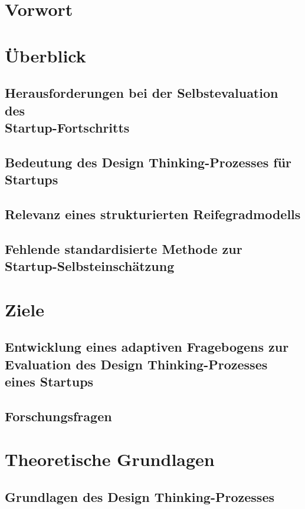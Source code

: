 \thispagestyle{fancy}
\chapter{Vorwort}
\chapter{Überblick}

\section{Herausforderungen bei der Selbstevaluation des \\ Startup-Fortschritts}
\section{Bedeutung des Design Thinking-Prozesses für Startups}

\section{Relevanz eines strukturierten Reifegradmodells}
\section{Fehlende standardisierte Methode zur \\ Startup-Selbsteinschätzung}
\chapter{Ziele}

\section{Entwicklung eines adaptiven Fragebogens zur Evaluation des Design Thinking-Prozesses eines Startups}
\section{Forschungsfragen}


\chapter{Theoretische Grundlagen}

\section{Grundlagen des Design Thinking-Prozesses}
